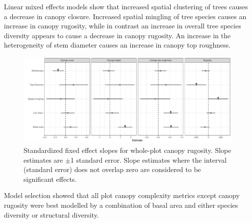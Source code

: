 \documentclass[11pt,a4paper]{article}
\begin{document}
Linear mixed effects models show that increased spatial clustering of trees causes a decrease in canopy closure. Increased spatial mingling of tree species causes an increase in canopy rugosity, while in contrast an increase in overall tree species diversity appears to cause a decrease in canopy rugosity. An increase in the heterogeneity of stem diameter causes an increase in canopy top roughness.

\begin{figure}
	\includegraphics[width=\textwidth]{canopy_rough_slopes}
	\caption{Standardized fixed effect slopes for whole-plot canopy rugosity. Slope estimates are $\pm$1 standard error. Slope estimates where the interval (standard error) does not overlap zero are considered to be significant effects.}
	\label{canopy_rough_slopes}
\end{figure}

Model selection showed that all plot canopy complexity metrics except canopy rugosity were best modelled by a combination of basal area and either species diversity or structural diversity. 

%
\end{document}
